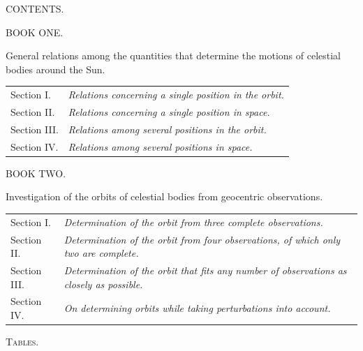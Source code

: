 \clearpage
{}
\begin{center}
{\Large CONTENTS.}\par\bigskip
{\large BOOK ONE.}\par\medskip
General relations among the quantities that determine the motions of celestial bodies around the Sun.
\end{center}
\noindent\begin{tabular}{@{}p{.18\linewidth}p{.78\linewidth}@{}}
Section I. & \emph{Relations concerning a single position in the orbit.}\\[.4em]
Section II. & \emph{Relations concerning a single position in space.}\\[.4em]
Section III. & \emph{Relations among several positions in the orbit.}\\[.4em]
Section IV. & \emph{Relations among several positions in space.}
\end{tabular}
\begin{center}\bigskip
{\large BOOK TWO.}\par\medskip
Investigation of the orbits of celestial bodies from geocentric observations.
\end{center}
\noindent\begin{tabular}{@{}p{.18\linewidth}p{.78\linewidth}@{}}
Section I. & \emph{Determination of the orbit from three complete observations.}\\[.4em]
Section II. & \emph{Determination of the orbit from four observations, of which only two are complete.}\\[.4em]
Section III. & \emph{Determination of the orbit that fits any number of observations as closely as possible.}\\[.4em]
Section IV. & \emph{On determining orbits while taking perturbations into account.}
\end{tabular}
\par\bigskip\noindent\textsc{Tables.}
